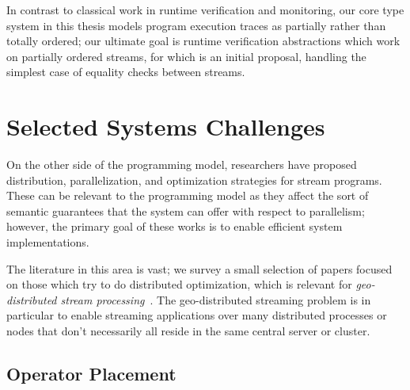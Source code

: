 In contrast to classical work in runtime verification and monitoring, our core type system in this thesis models program execution traces as partially rather than totally ordered; our ultimate goal is runtime verification abstractions which work on partially ordered streams, for which  is an initial proposal, handling the simplest case of equality checks between streams.

\section{Selected Systems Challenges}

On the other side of the programming model,
researchers have proposed distribution, parallelization, and optimization strategies for stream programs.
These can be relevant to the programming model as they affect the sort of semantic guarantees that the system can offer with respect to parallelism;
however, the primary goal of these works is to enable efficient system implementations.

The literature in this area is vast; we survey a small selection of papers focused on those which try to do distributed optimization, which is relevant for \emph{geo-distributed stream processing}~. The geo-distributed streaming problem is in particular to enable streaming applications over many distributed processes or nodes that don't necessarily all reside in the same central server or cluster.

\subsection{Operator Placement}

